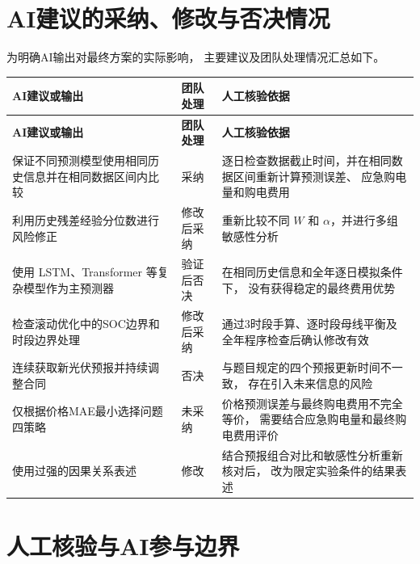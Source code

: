 \documentclass[UTF8,a4paper,11pt]{ctexart}
\begin{document}
\section{AI建议的采纳、修改与否决情况}

为明确AI输出对最终方案的实际影响，
主要建议及团队处理情况汇总如下。

\begin{longtable}{
    L{0.31\textwidth}
    C{0.15\textwidth}
    L{0.43\textwidth}
}
\toprule
\textbf{AI建议或输出} &
\textbf{团队处理} &
\textbf{人工核验依据} \\
\midrule
\endfirsthead

\toprule
\textbf{AI建议或输出} &
\textbf{团队处理} &
\textbf{人工核验依据} \\
\midrule
\endhead

保证不同预测模型使用相同历史信息并在相同数据区间内比较 &
采纳 &
逐日检查数据截止时间，并在相同数据区间重新计算预测误差、
应急购电量和购电费用 \\

利用历史残差经验分位数进行风险修正 &
修改后采纳 &
重新比较不同 $W$ 和 $\alpha$，并进行多组敏感性分析 \\

使用 LSTM、Transformer 等复杂模型作为主预测器 &
验证后否决 &
在相同历史信息和全年逐日模拟条件下，
没有获得稳定的最终费用优势 \\

检查滚动优化中的SOC边界和时段边界处理 &
修改后采纳 &
通过3时段手算、逐时段母线平衡及全年程序检查后确认修改有效 \\

连续获取新光伏预报并持续调整合同 &
否决 &
与题目规定的四个预报更新时间不一致，
存在引入未来信息的风险 \\

仅根据价格MAE最小选择问题四策略 &
未采纳 &
价格预测误差与最终购电费用不完全等价，
需要结合应急购电量和最终购电费用评价 \\

使用过强的因果关系表述 &
修改 &
结合预报组合对比和敏感性分析重新核对后，
改为限定实验条件的结果表述 \\

\bottomrule
\end{longtable}

\section{人工核验与AI参与边界}
\end{document}
